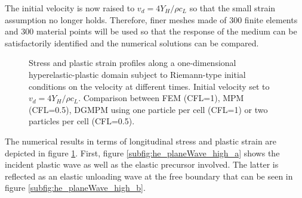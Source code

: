 The initial velocity is now raised to $v_d=4Y_H/\rho c_L$ so that the small strain assumption no longer holds.
Therefore, finer meshes made of $300$ finite elements and $300$ material points will be used so that the response of the medium can be satisfactorily identified and the numerical solutions can be compared.
%   
\begin{figure}[H]
  \centering
  {}
  {}
  {}
  {}
  {}
  {}
  {}
  {}
  {}
  
  
  
  \caption{Stress and plastic strain profiles along a one-dimensional hyperelastic-plastic domain subject to Riemann-type initial conditions on the velocity at different times. Initial velocity set to $v_d=4Y_H/\rho c_L$.
  Comparison between FEM (CFL=1), MPM (CFL=0.5), DGMPM using one particle per cell (CFL=1) or two particles per cell (CFL=0.5).
  }
  \label{fig:hep_planeWave_high}
\end{figure}
The numerical results in terms of longitudinal stress and plastic strain are depicted in figure \ref{fig:hep_planeWave_high}.
First, figure \ref{subfig:he_planeWave_high_a} shows the incident plastic wave as well as the elastic precursor involved.
The latter is reflected as an elastic unloading wave at the free boundary that can be seen in figure \ref{subfig:he_planeWave_high_b}.
